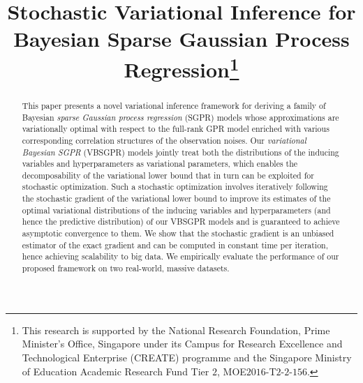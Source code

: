 \documentclass[conference]{IEEEtran}
\begin{document}
\title{Stochastic Variational Inference for Bayesian Sparse Gaussian Process Regression\thanks{This research is supported by the National Research Foundation, Prime Minister’s Office, Singapore under its Campus for Research Excellence and Technological Enterprise (CREATE) programme and the Singapore Ministry of Education Academic Research Fund Tier $2$, MOE$2016$-T$2$-$2$-$156$.}
}

\author{ 
\and
{}
\and
{}
\and
{}
}

\maketitle

\begin{abstract}
This paper presents a novel  variational inference framework for deriving a family of  Bayesian \emph{sparse Gaussian process regression} (SGPR) models whose approximations are variationally optimal with respect to the full-rank GPR model enriched with various corresponding correlation structures of the observation noises.
Our \emph{variational Bayesian SGPR} (VBSGPR) models jointly treat both the distributions of the inducing variables and hyperparameters as variational parameters, which enables the decomposability of the variational lower bound that in turn can be exploited for stochastic optimization.  
Such a stochastic optimization involves iteratively following the stochastic gradient of the variational lower bound to improve its estimates of the optimal variational distributions of the inducing variables and hyperparameters (and hence the predictive distribution) of our VBSGPR models and is guaranteed to achieve asymptotic convergence to them.
We show that the  stochastic gradient is an unbiased estimator of the exact gradient and can be computed in constant time per iteration, hence achieving scalability to big data.
We empirically evaluate the performance of our proposed framework on two real-world, massive datasets.
\end{abstract}
\end{document}
